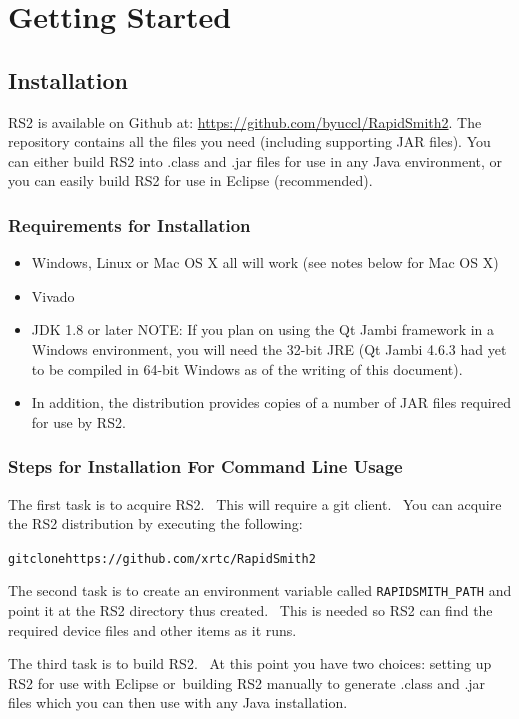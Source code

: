 \documentclass[12pt]{article}
\newcommand{\env}[1]{{\texttt{#1}}}
\newenvironment{code}{\begin{center} \begin{minipage}{6in} \noindent \begin{alltt}}{\end{alltt} \end{minipage} \end{center}}
\begin{document}
\section{Getting Started}

\subsection{Installation}

RS2 is available on Github at: \url{https://github.com/byuccl/RapidSmith2}.  The
repository contains all the files you need (including supporting JAR files). 
You can either build RS2 into .class and .jar files for use in any Java
environment, or you can easily build RS2 for use in Eclipse (recommended).

\subsubsection{Requirements for Installation}
\begin{itemize}
  \item Windows, Linux or Mac OS X all will work (see notes below for Mac OS X)
  \item Vivado
  \item JDK 1.8 or later NOTE: If you plan on using the Qt Jambi framework in a
  Windows environment, you will need the 32-bit JRE (Qt Jambi 4.6.3 had yet to
  be compiled in 64-bit Windows as of the writing of this document).
  \item In addition, the distribution provides copies of a number of JAR files
  required for use by RS2.
 \end{itemize}
 
\subsubsection{Steps for Installation For Command Line Usage}
The first task is to acquire RS2.  This will require a git client.  You can
acquire the RS2 distribution by executing the following: 
\vspace{-0.15in}  \begin{code}
git clone https://github.com/xrtc/RapidSmith2
\end{code} 
The second task is to create an environment variable called
\env{RAPIDSMITH\_PATH} and point it at the RS2 directory thus created.  This is
needed so RS2 can find the required device files and other items as it runs.

The third task is to build RS2.  At this point you have two choices: setting up
RS2 for use with Eclipse or building RS2 manually to generate
.class and .jar files which you can then use with any Java installation.
	
\end{document}
